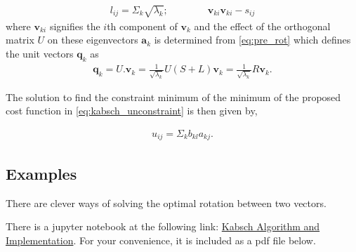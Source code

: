  \begin{align}
 	l_{ij} = \Sigma_k \sqrt{\lambda_k}; \qquad \qquad \bm{v}_{ki} \bm{v}_{ki} - s_{ij}
 \end{align}
 where $\bm{v}_{ki}$ signifies the $i$th component of $\bm{v}_k$ and the effect of the orthogonal matrix $U$ on these eigenvectors $\bm{a}_k$ is determined from \eqref{eq:pre_rot} which defines the unit vectors $\bm{q}_k$ as 
 \begin{align}
 	\bm{q}_k = U . \bm{v}_k = \frac{1}{\sqrt{\lambda_k}} U (S+L) \bm{v}_k = \frac{1}{\sqrt{\lambda_k}} R \bm{v}_k.
 \end{align}
 
 The solution to find the constraint minimum of the minimum of the proposed cost function in \eqref{eq:kabsch_unconstraint} is then given by,
 \begin{tcolorbox}[title=Kabsch's Optimal Rotation]
 	\begin{align}
 		u_{ij} = \Sigma_k b_{kl} a_{kj}.
 	\end{align}
 \end{tcolorbox}

\subsection{Examples}
%
There are clever ways of solving the optimal rotation between two vectors.

There is a jupyter notebook at the following  link: \href{https://colab.research.google.com/drive/1DL_Hq-Bp-pQuQyR6nDHnzwxIqhj4_Obq}{Kabsch Algorithm and Implementation}. For your convenience, it is included as a pdf file below.



